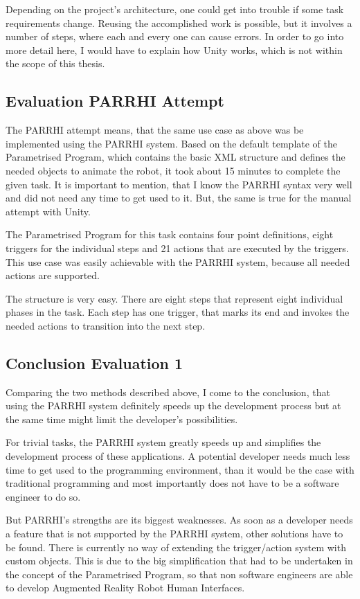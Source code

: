 Depending on the project's architecture, one could get into trouble if some task requirements change. Reusing the accomplished work is possible, but it involves a number of steps, where each and every one can cause errors. In order to go into more detail here, I would have to explain how Unity works, which is not within the scope of this thesis. 

\subsection{Evaluation PARRHI Attempt}
The PARRHI attempt means, that the same use case as above was be implemented using the PARRHI system. Based on the default template of the Parametrised Program, which contains the basic XML structure and defines the needed objects to animate the robot, it took about 15 minutes to complete the given task. It is important to mention, that I know the PARRHI syntax very well and did not need any time to get used to it. But, the same is true for the manual attempt with Unity.

The Parametrised Program for this task contains four point definitions, eight triggers for the individual steps and 21 actions that are executed by the triggers. This use case was easily achievable with the PARRHI system, because all needed actions are supported. 

The structure is very easy. There are eight steps that represent eight individual phases in the task. Each step has one trigger, that marks its end and invokes the needed actions to transition into the next step. 

\subsection{Conclusion Evaluation 1}
Comparing the two methods described above, I come to the conclusion, that using the PARRHI system definitely speeds up the development process but at the same time might limit the developer's possibilities. 

For trivial tasks, the PARRHI system greatly speeds up and simplifies the development process of these applications. A potential developer needs much less time to get used to the programming environment, than it would be the case with traditional programming and most importantly does not have to be a software engineer to do so.

But PARRHI's strengths are its biggest weaknesses. As soon as a developer needs a feature that is not supported by the PARRHI system, other solutions have to be found. There is currently no way of extending the trigger/action system with custom objects. This is due to the big simplification that had to be undertaken in the concept of the Parametrised Program, so that non software engineers are able to develop Augmented Reality Robot Human Interfaces. 


